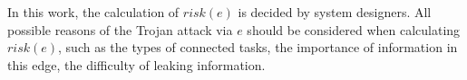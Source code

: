 \documentclass[10pt,journal]{IEEEtran}
\newtheorem{definition}{\textbf{Definition}}
\begin{document}
In this work, the calculation of $risk(e)$ is decided by system designers. All possible reasons of the Trojan attack via $e$ should be considered when calculating $risk(e)$, such as the types of connected tasks, the importance of information in this edge, the difficulty of leaking information.








\end{document}
